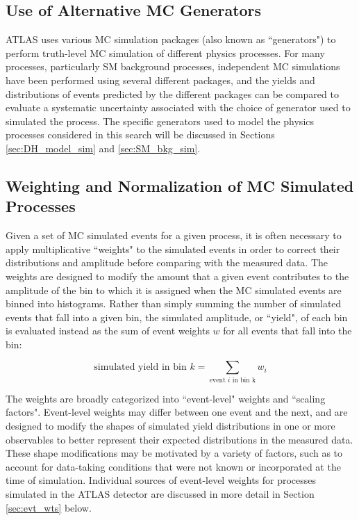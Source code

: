 \subsection{Use of Alternative MC Generators}

ATLAS uses various MC simulation packages (also known as ``generators") to perform truth-level MC simulation of different physics processes. For many processes, particularly SM background processes, independent MC simulations have been performed using several different packages, and the yields and distributions of events predicted by the different packages can be compared to evaluate a systematic uncertainty associated with the choice of generator used to simulated the process. The specific generators used to model the physics processes considered in this search will be discussed in Sections \ref{sec:DH_model_sim} and \ref{sec:SM_bkg_sim}.

\subsection{Weighting and Normalization of MC Simulated Processes}
\label{sec:evt_weights}

Given a set of MC simulated events for a given process, it is often necessary to apply multiplicative ``weights" to the simulated events in order to correct their distributions and amplitude before comparing with the measured data. The weights are designed to modify the amount that a given event contributes to the amplitude of the bin to which it is assigned when the MC simulated events are binned into histograms. Rather than simply summing the number of simulated events that fall into a given bin, the simulated amplitude, or ``yield", of each bin is evaluated instead as the sum of event weights \(w\) for all events that fall into the bin:

\begin{equation}
\label{eq:weighted_bin_amplitude}
\text{simulated yield in bin \(k\)} = \sum_\text{event \(i\) in bin k} w_i
\end{equation}

The weights are broadly categorized into ``event-level" weights and ``scaling factors". Event-level weights may differ between one event and the next, and are designed to modify the shapes of simulated yield distributions in one or more observables to better represent their expected distributions in the measured data. These shape modifications may be motivated by a variety of factors, such as to account for data-taking conditions that were not known or incorporated at the time of simulation. Individual sources of event-level weights for processes simulated in the ATLAS detector are discussed in more detail in Section \ref{sec:evt_wts} below. 

